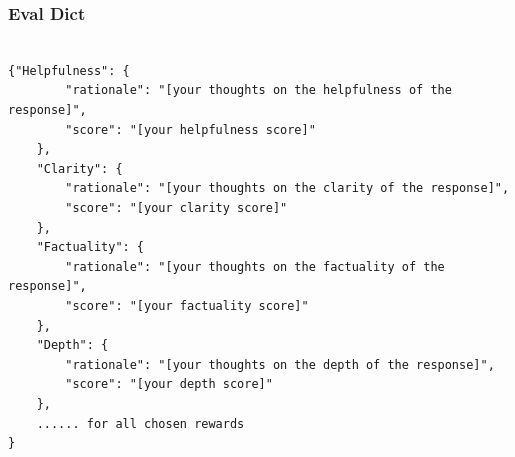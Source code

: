 \subsubsection{Eval Dict}
\label{sec:eval_dict}
\begin{lstlisting}[breaklines=true,breakatwhitespace=true]

{"Helpfulness": {
        "rationale": "[your thoughts on the helpfulness of the response]",
        "score": "[your helpfulness score]"
    },
    "Clarity": {
        "rationale": "[your thoughts on the clarity of the response]",
        "score": "[your clarity score]"
    },
    "Factuality": {
        "rationale": "[your thoughts on the factuality of the response]",
        "score": "[your factuality score]"
    },
    "Depth": {
        "rationale": "[your thoughts on the depth of the response]",
        "score": "[your depth score]"
    },
    ...... for all chosen rewards
}

\end{lstlisting}

